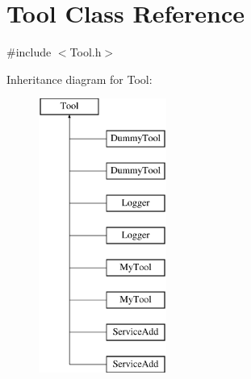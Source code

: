 \hypertarget{classTool}{\section{Tool Class Reference}
\label{classTool}
}


{\ttfamily \#include $<$Tool.\-h$>$}

Inheritance diagram for Tool\-:\begin{figure}[H]
\begin{center}
\leavevmode
\includegraphics[height=9.000000cm]{classTool}
\end{center}
\end{figure}
